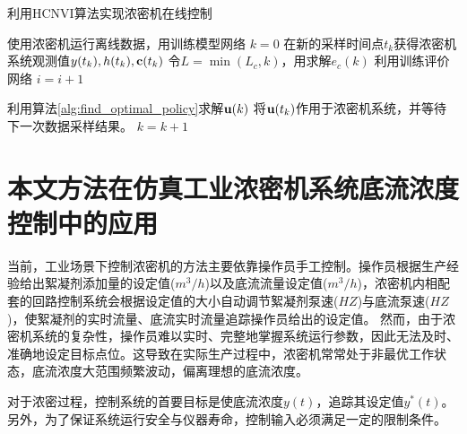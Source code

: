\begin{algorithm}[!ht]

\caption{利用HCNVI算法实现浓密机在线控制} %
\label{alg:HCNVI}

\begin{algorithmic}[1]


\State
使用浓密机运行离线数据，用训练模型网络
\State $k=0$ 
\State 在新的采样时间点$t_k$获得浓密机系统观测值$y(t_k), h(t_k),\mathbf c(t_k)$
\Do
    \State 令$L=\min(L_c, k)$，用求解$e_c(k)$
    \State 利用训练评价网络
    \State $i=i+1$

\State 利用算法\ref{alg:find_optimal_policy}求解${\mathbf u}(k)$ \State
将${\mathbf u}(t_k)$作用于浓密机系统，并等待下一次数据采样结果。 \State $k=k+1$

\EndWhile
\end{algorithmic}

\end{algorithm}

\section{本文方法在仿真工业浓密机系统底流浓度控制中的应用}
\label{sec:experiment}
当前，工业场景下控制浓密机的方法主要依靠操作员手工控制。操作员根据生产经验给出絮凝剂添加量的设定值($m^3/h$)以及底流流量设定值($m^3/h$)，浓密机内相配套的回路控制系统会根据设定值的大小自动调节絮凝剂泵速($HZ$)与底流泵速($HZ$)，使絮凝剂的实时流量、底流实时流量追踪操作员给出的设定值。
然而，由于浓密机系统的复杂性，操作员难以实时、完整地掌握系统运行参数，因此无法及时、准确地设定目标点位。这导致在实际生产过程中，浓密机常常处于非最优工作状态，底流浓度大范围频繁波动，偏离理想的底流浓度。

对于浓密过程，控制系统的首要目标是使底流浓度$y(t)$，追踪其设定值$y^*(t)$。另外，为了保证系统运行安全与仪器寿命，控制输入必须满足一定的限制条件。
